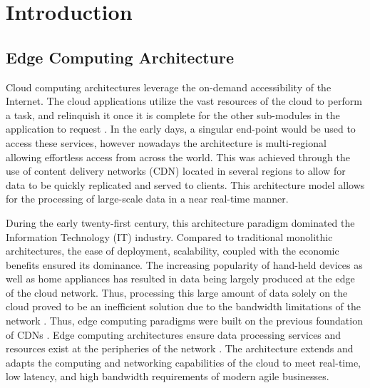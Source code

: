 \clearpage

\def\chaptertitle{Introduction}

\lhead{\emph{\chaptertitle}}

\chapter{\chaptertitle}
\label{ch:introduction}

\section{Edge Computing Architecture}

Cloud computing architectures leverage the on-demand accessibility of the Internet. The cloud applications utilize the vast resources of the cloud to perform a task, and relinquish it once it is complete for the other sub-modules in the application to request \cite{rimal2009taxonomy}. In the early days, a singular end-point would be used to access these services, however nowadays the architecture is multi-regional allowing effortless access from across the world. This was achieved through the use of content delivery networks (CDN) located in several regions to allow for data to be quickly replicated and served to clients. This architecture model allows for the processing of large-scale data in a near real-time manner.\par

During the early twenty-first century, this architecture paradigm dominated the Information Technology (IT) industry. Compared to traditional monolithic architectures, the ease of deployment, scalability, coupled with the economic benefits ensured its dominance. The increasing popularity of hand-held devices as well as home appliances has resulted in data being largely produced at the edge of the cloud network. Thus, processing this large amount of data solely on the cloud proved to be an inefficient solution due to the bandwidth limitations of the network \cite{shi2016edge}. Thus, edge computing paradigms were built on the previous foundation of CDNs \cite{satyanarayanan2017emergence}. Edge computing architectures ensure data processing services and resources exist at the peripheries of the network \cite{cao2020overview}. The architecture extends and adapts the computing and networking capabilities of the cloud to meet real-time, low latency, and high bandwidth requirements of modern agile businesses.\par

